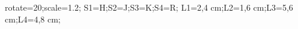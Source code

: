 \documentclass[exercice]{thedocument}%
\begin{document}
%
    \>rotate=20;\>scale=1.2;%
    \>S1=H;\>S2=J;\>S3=K;\>S4=R;%
    \>L1=2,4 cm;\>L2=1,6 cm;\>L3=5,6 cm;\>L4=4,8 cm;%
\end{document}
